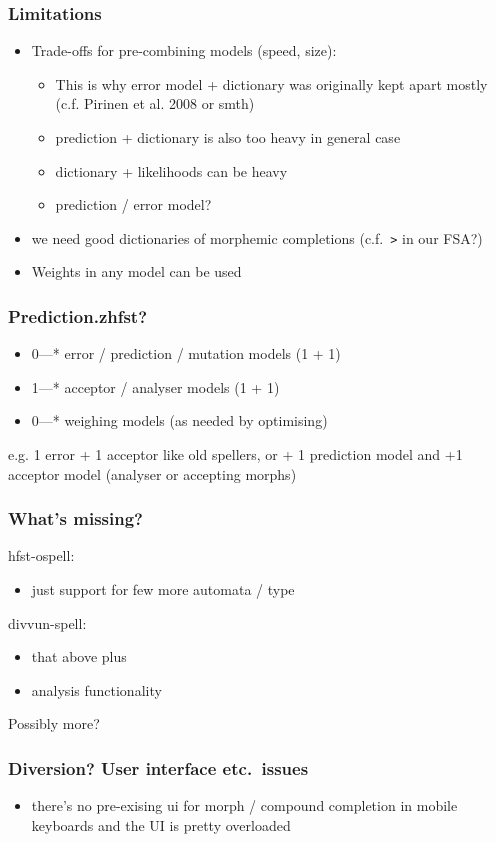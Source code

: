 \documentclass{beamer}
\begin{document}
\begin{frame}
    \frametitle{Limitations}
    \begin{itemize}
        \item Trade-offs for pre-combining models (speed,
            size):\begin{itemize}
                \item This is why error model + dictionary was originally kept
                    apart mostly (c.f. Pirinen et al. 2008 or smth)
                \item prediction + dictionary is also too heavy in general case
                \item dictionary + likelihoods can be heavy
                \item prediction / error model?
            \end{itemize}
        \item we need good dictionaries of morphemic completions (c.f.\
            \texttt{>}
            in our FSA?)
        \item Weights in any model can be used
    \end{itemize}
\end{frame}

\begin{frame}
    \frametitle{Prediction.zhfst?}
    \begin{itemize}
        \item 0---* error / prediction / mutation models (1 + 1)
        \item 1---* acceptor / analyser models (1 + 1)
        \item 0---* weighing models (as needed by optimising)
    \end{itemize}
    e.g. 1 error + 1 acceptor like old spellers, or + 1 prediction model and +1
    acceptor model (analyser or accepting morphs)
\end{frame}

\begin{frame}
    \frametitle{What's missing?}
    hfst-ospell:
    \begin{itemize}
        \item just support for few more automata / type
    \end{itemize}
    divvun-spell:
    \begin{itemize}
        \item that above plus
        \item analysis functionality
    \end{itemize}
    Possibly more?
\end{frame}


\begin{frame}
    \frametitle{Diversion? User interface etc.\ issues}
    \begin{itemize}
        \item there's no pre-exising ui for morph / compound completion in
            mobile keyboards and the UI is pretty overloaded
    \end{itemize}
\end{frame}
\end{document}
